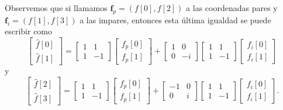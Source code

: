 \documentclass[12pt, a4paper]{amsbook}
\newcommand{\ff}{{\mathbf f}}
\theoremstyle{remark}
\theoremstyle{definition}
\numberwithin{section}{chapter}
\numberwithin{subsection}{section}
\numberwithin{equation}{section}
\numberwithin{figure}{chapter}
\begin{document}
Observemos que si llamamos $\ff_p = (f[0], f[2])$ a las coordenadas pares y $\ff_i = (f[1], f[3])$ a las impares, entonces esta última igualdad se puede escribir como
$$
\begin{bmatrix}
\hat f[0]\\
\hat f[1]
\end{bmatrix}
=
\begin{bmatrix}
1 & 1\\
1 & -1 
\end{bmatrix}
\begin{bmatrix}
f_p[0]\\
f_p[1]
\end{bmatrix}
+
\begin{bmatrix}
1 & 0\\
0 & -i 
\end{bmatrix}
\begin{bmatrix}
1 & 1\\
1 & -1 
\end{bmatrix}
\begin{bmatrix}
f_i[0]\\
f_i[1]
\end{bmatrix}
$$
y
$$
\begin{bmatrix}
\hat f[2]\\
\hat f[3]
\end{bmatrix}
=
\begin{bmatrix}
1 & 1\\
1 & -1 
\end{bmatrix}
\begin{bmatrix}
f_p[0]\\
f_p[1]
\end{bmatrix}
+
\begin{bmatrix}
-1 & 0\\
0 & i 
\end{bmatrix}
\begin{bmatrix}
1 & 1\\
1 & -1 
\end{bmatrix}
\begin{bmatrix}
f_i[0]\\
f_i[1]
\end{bmatrix}.
$$
\end{document}
